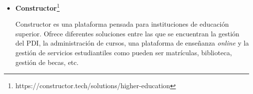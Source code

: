 \begin{itemize}
\item \textbf{Constructor}\footnote{https://constructor.tech/solutions/higher-education}

Constructor es una plataforma pensada para instituciones de educación superior.
Ofrece diferentes soluciones entre las que se encuentran la gestión del PDI, la administración de cursos, una plataforma de enseñanza \textit{online} y la gestión de servicios estudiantiles como pueden ser matrículas, biblioteca, gestión de becas, etc.


\end{itemize}
